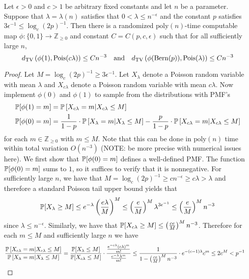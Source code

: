 \documentclass[11pt]{article}
\begin{document}
\begin{lemma}
Let $\epsilon > 0$ and $c > 1$ be arbitrary fixed constants and let $n$ be a parameter. Suppose that $\lambda = \lambda(n)$ satisfies that $0 < \lambda \le n^{-\epsilon}$ and the constant $p$ satisfies $3\epsilon^{-1} \le \log_c (2p)^{-1}$. Then there is a randomized $\text{poly}(n)$-time computable map $\phi : \{0, 1\} \to \mathbb{Z}_{\ge 0}$ and constant $C = C(p, c, \epsilon)$ such that for all sufficiently large $n$,
$$d_{\text{TV}}\left(\phi(1), \text{Pois}(c\lambda) \right) \le C n^{-3} \quad \text{and} \quad d_{\text{TV}}\left(\phi(\text{Bern}(p)), \text{Pois}(\lambda) \right) \le Cn^{-3}$$
\end{lemma}

\begin{proof}
Let $M = \log_c (2p)^{-1} \ge 3\epsilon^{-1}$. Let $X_\lambda$ denote a Poisson random variable with mean $\lambda$ and $X_{c\lambda}$ denote a Poisson random variable with mean $c \lambda$. Now implement $\phi(0)$ and $\phi(1)$ to sample from the distributions with PMF's
\begin{align*}
\mathbb{P}[\phi(1) = m] &= \mathbb{P}\left[X_{c\lambda} = m | X_{c\lambda} \le M \right] \\
\mathbb{P}[\phi(0) = m] &= \frac{1}{1 - p} \cdot \mathbb{P}\left[X_{\lambda} = m | X_{\lambda} \le M \right] - \frac{p}{1 - p} \cdot \mathbb{P}\left[X_{c\lambda} = m | X_{c\lambda} \le M \right]
\end{align*}
for each $m \in \mathbb{Z}_{\ge 0}$ with $m \le M$. Note that this can be done in $\text{poly}(n)$ time within total variation $O(n^{-3})$ (NOTE: be more precise with numerical issues here). We first show that $\mathbb{P}[\phi(0) = m]$ defines a well-defined PMF. The function $\mathbb{P}[\phi(0) = m]$ sums to $1$, so it suffices to verify that it is nonnegative. For sufficiently large $n$, we have that $M = \log_c (2p)^{-1} \ge cn^{-\epsilon} \ge c\lambda > \lambda$ and therefore a standard Poisson tail upper bound yields that
$$\mathbb{P}[X_{\lambda} \ge M] \le e^{-\lambda} \left(\frac{e\lambda}{M} \right)^M \le \left(\frac{e}{M} \right)^M \lambda^{3\epsilon^{-1}} \le \left(\frac{e}{M} \right)^M n^{-3}$$
since $\lambda \le n^{-\epsilon}$. Similarly, we have that $\mathbb{P}[X_{c\lambda} \ge M] \le \left(\frac{ce}{M} \right)^M n^{-3}$. Therefore for each $m \le M$ and sufficiently large $n$ we have
\begin{align*}
\frac{\bP\left[X_{c\lambda} = m | X_{c\lambda} \le M \right]}{\bP\left[X_{\lambda} = m | X_{\lambda} \le M \right]} &= \frac{\bP[X_\lambda \le M]}{\bP[X_{c\lambda} \le M]} \cdot \frac{\frac{e^{-c\lambda} (c\lambda)^m}{m!}}{\frac{e^{-\lambda} \lambda^m}{m!}} \le \frac{1}{1 - \left(\frac{ce}{M} \right)^M n^{-3}} \cdot e^{-(c - 1)\lambda} c^m \le 2 c^M < p^{-1}

\end{align*}
\end{proof}
\end{document}
